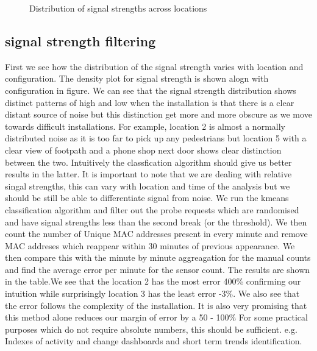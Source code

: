 \begin{figure}
	\caption{Distribution of signal strengths across locations} \label{methodology_schematic}
\end{figure}

\subsection{signal strength filtering}
First we see how the distribution of the signal strength varies with location and configuration. 
The density plot for signal strength is shown alogn with configuration in figure.
We can see that the signal strength distribution shows distinct patterns of high and low when the installation is that there is a clear distant source of noise but this distinction get more and more obscure as we move towards difficult installations. 
For example, location 2 is almost a normally distributed noise as it is too far to pick up any pedestrians but location 5 with a clear view of footpath and a phone shop next door shows clear distinction between the two. 
Intuitively the classfication algorithm should give us better results in the latter. 
It is important to note that we are dealing with relative singal strengths, this can vary with location and time of the analysis but we should be still be able to differentiate signal from noise. 
We run the kmeans classification algorithm and filter out the probe requests which are randomised and have signal strengths less than the second break (or the threshold). 
We then count the number of Unique MAC addresses present in every minute and remove MAC addreses which reappear within 30 minutes of previous appearance. 
We then compare this with the minute by minute aggreagation for the manual counts and find the average error per minute for the sensor count. 
The results are shown in the table.We see that the location 2 has the most error 400\% confirming our intuition while surprisingly location 3 has the least error -3\%. 
We also see that the error follows the complexity of the installation. 
It is also very promising that this method alone reduces our margin of error by a 50 - 100\%
For some practical purposes which do not require absolute numbers, this should be sufficient. 
e.g. Indexes of activity and change dashboards and short term trends identification.

